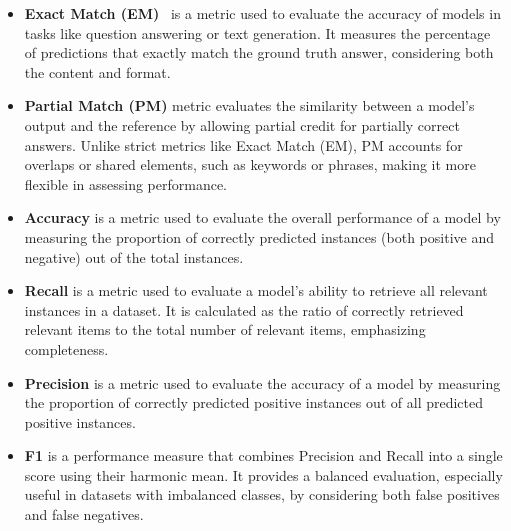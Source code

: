\begin{itemize}[leftmargin=10pt]
    \item \textbf{Exact Match (EM)}~\cite{DBLP:journals/corr/RajpurkarZLL16} is a metric used to evaluate the accuracy of models in tasks like question answering or text generation. It measures the percentage of predictions that exactly match the ground truth answer, considering both the content and format.%
    \item \textbf{Partial Match (PM)} metric evaluates the similarity between a model's output and the reference by allowing partial credit for partially correct answers. Unlike strict metrics like Exact Match (EM), PM accounts for overlaps or shared elements, such as keywords or phrases, making it more flexible in assessing performance.%
    \item \textbf{Accuracy} is a metric used to evaluate the overall performance of a model by measuring the proportion of correctly predicted instances (both positive and negative) out of the total instances. %
    \item \textbf{Recall} is a metric used to evaluate a model's ability to retrieve all relevant instances in a dataset. It is calculated as the ratio of correctly retrieved relevant items to the total number of relevant items, emphasizing completeness. %
    \item \textbf{Precision} is a metric used to evaluate the accuracy of a model by measuring the proportion of correctly predicted positive instances out of all predicted positive instances. %
    \item  \textbf{F1} is a performance measure that combines Precision and Recall into a single score using their harmonic mean. It provides a balanced evaluation, especially useful in datasets with imbalanced classes, by considering both false positives and false negatives. %

\end{itemize}
